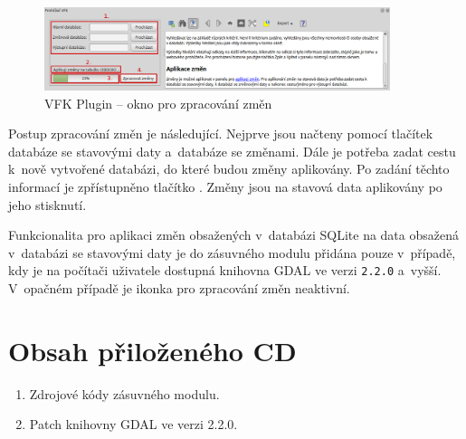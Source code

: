 \documentclass[a4paper,12pt,oneside]{book}
\begin{document}
\begin{figure}[htb]
\centering
\includegraphics[width=0.9\textwidth]{images/vfkPlugin-prirucka_zmeny.png}
\caption[VFK Plugin -- okno pro zpracování změn]{VFK Plugin -- okno pro zpracování změn}
\label{l_plugin_zmeny}
\end{figure}

Postup zpracování změn je následující. Nejprve jsou načteny pomocí tlačítek  databáze se stavovými daty a~databáze se změnami. Dále je potřeba zadat cestu k~nově vytvořené databázi, do které budou změny aplikovány. Po zadání těchto informací je zpřístupněno tlačítko . Změny jsou na stavová data aplikovány po jeho stisknutí.

Funkcionalita pro aplikaci změn obsažených v~databázi SQLite na data obsažená v~databázi se stavovými daty je do zásuvného modulu přidána pouze v~případě, kdy je na počítači uživatele dostupná knihovna GDAL ve verzi \texttt{2.2.0} a~vyšší. V~opačném případě je ikonka pro zpracování změn neaktivní.

\chapter{Obsah přiloženého CD}

\begin{enumerate}
 \item Zdrojové kódy zásuvného modulu.
 \item Patch knihovny GDAL ve verzi 2.2.0.
\end{enumerate}
\end{document}

